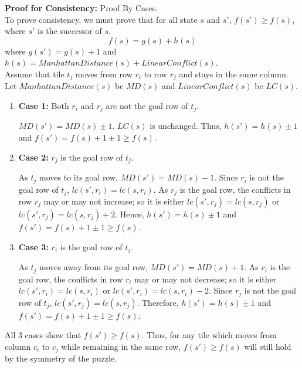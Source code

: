 \documentclass[runningheads]{llncs}
\begin{document}
\textbf{Proof for Consistency:} Proof By Cases. \\
    To prove consistency, we must prove that for all state \( s \) and \( s' \), \( f(s') \geq f(s) \), where \( s' \) is the successor of \( s \).
\[
    f(s) = g(s) + h(s)
\]
where $g(s') = g(s) + 1$ and $h(s) = ManhattanDistance(s) + LinearConflict(s)$. \\
Assume that tile \( t_j \) moves from row \( r_i \) to row \( r_j \) and stays in the same column. Let \( ManhattanDistance(s) \) be \( MD(s) \) and \( LinearConflict(s) \) be \( LC(s) \). 
\begin{enumerate}
    \item \textbf{Case 1:} Both \( r_i \) and \( r_j \) are not the goal row of \( t_j \).
    
        \( MD(s') = MD(s) \pm 1 \). \( LC(s) \) is unchanged. Thus, \( h(s') = h(s) \pm 1 \) and \( f(s') = f(s) + 1 \pm 1 \geq f(s) \).
    
    \item \textbf{Case 2:} \( r_j \) is the goal row of \( t_j \).
        
        As \( t_j \) moves to its goal row, \( MD(s') = MD(s) - 1 \). Since \( r_i \) is not the goal row of \( t_j \), \( lc(s', r_i) = lc(s, r_i) \). 
        As \( r_j \) is the goal row, the conflicts in row \( r_j \) may or may not increase; so it is either \( lc(s', r_j) = lc(s, r_j) \) or \( lc(s', r_j) = lc(s, r_j) + 2 \). 
        Hence, \( h(s') = h(s) \pm 1 \) and \( f(s') = f(s) + 1 \pm 1 \geq f(s) \).

    \item \textbf{Case 3:} \( r_i \) is the goal row of \( t_j \).
    
        As \( t_j \) moves away from its goal row, \( MD(s') = MD(s) + 1 \). 
        As \( r_i \) is the goal row, the conflicts in row \( r_i \) may or may not decrease; so it is either \( lc(s', r_i) = lc(s, r_i) \) or \( lc(s', r_i) = lc(s, r_i) - 2 \). 
        Since \( r_j \) is not the goal row of \( t_j \), \( lc(s', r_j) = lc(s, r_j) \). 
        Therefore, \( h(s') = h(s) \pm 1 \) and \( f(s') = f(s) + 1 \pm 1 \geq f(s) \).
\end{enumerate}
All 3 cases show that \( f(s') \geq f(s) \). Thus, for any tile which moves from column \( c_i \) to \( c_j \) while remaining in the same row, \( f(s') \geq f(s) \) will still hold by the symmetry of the puzzle.
\end{document}
